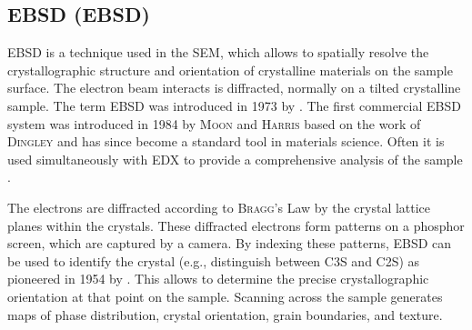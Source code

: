 
\FloatBarrier

\subsection{\Acl*{EBSD} (\acs*{EBSD})}
\label{sec:ebsd}

\ac{EBSD} is a technique used in the \ac{SEM}, which allows to spatially resolve the crystallographic structure and orientation of crystalline materials on the sample surface.
The electron beam interacts is diffracted, normally on a tilted crystalline sample.
The term \ac{EBSD} was introduced in 1973 by \textcite{venables.1973}.
The first commercial \ac{EBSD} system was introduced in 1984 by \textsc{Moon} and \textsc{Harris} based on the work of \textsc{Dingley} \cite{wright.2000} and has since become a standard tool in materials science.
Often it is used simultaneously with \ac{EDX} to provide a comprehensive analysis of the sample \cite{wright.2000}.

The electrons are diffracted according to \textsc{Bragg}'s Law \cite{bragg.1913} by the crystal lattice planes within the crystals.
These diffracted electrons form \textcite{kikuchi.1928} patterns on a phosphor screen, which are captured by a camera.
By indexing these patterns, \ac{EBSD} can be used to identify the crystal (e.g., distinguish between \ac{C3S} and \ac{C2S}) as pioneered in 1954 by \textcite{alam.1954}.
This allows to determine the precise crystallographic orientation at that point on the sample.
Scanning across the sample generates maps of phase distribution, crystal orientation, grain boundaries, and texture.

